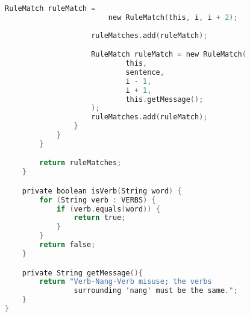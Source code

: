\begin{lstlisting}[language=C, caption=Implementation of Verb-Nang-Verb Grammar Rule in Java]
                    RuleMatch ruleMatch = 
                        new RuleMatch(this, i, i + 2);
                    
                    ruleMatches.add(ruleMatch);

                    RuleMatch ruleMatch = new RuleMatch(
                            this,
                            sentence,
                            i - 1,
                            i + 1,
                            this.getMessage();
                    );
                    ruleMatches.add(ruleMatch);
                }
            }
        }

        return ruleMatches;
    }

    private boolean isVerb(String word) {
        for (String verb : VERBS) {
            if (verb.equals(word)) {
                return true;
            }
        }
        return false;
    }

    private String getMessage(){
        return "Verb-Nang-Verb misuse; the verbs 
                surrounding 'nang' must be the same.";
    }
}
\end{lstlisting}

